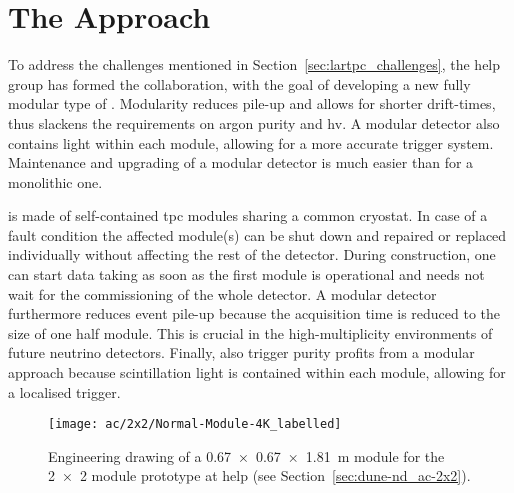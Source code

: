 \section{The \AC{} Approach}
\label{sec:ac_argoncube}

To address the challenges mentioned in Section~\ref{sec:lartpc_challenges}, the \gls{help} group has formed the \AC{} collaboration, with the goal of developing a new fully modular type of \lartpc{}.
Modularity reduces pile-up and allows for shorter drift-times, thus slackens the requirements on argon purity and \gls{hv}.
A modular detector also contains light within each module, allowing for a more accurate trigger system.
Maintenance and upgrading of a modular detector is much easier than for a monolithic one.

\AC{} is made of self-contained \gls{tpc} modules sharing a common cryostat.
In case of a fault condition the affected module(s) can be shut down and repaired or replaced individually without affecting the rest of the detector.
During construction, one can start data taking as soon as the first module is operational and needs not wait for the commissioning of the whole detector.
A modular detector furthermore reduces event pile-up because the acquisition time is reduced to the size of one half module.
This is crucial in the high-multiplicity environments of future \lar{} neutrino detectors.
Finally, also trigger purity profits from a modular approach because scintillation light is contained within each module, allowing for a localised trigger.

\begin{figure}[htb]
	\centering
	\texttt{[image: ac/2x2/Normal-Module-4K\_labelled]}
	\caption[\AC{} module engineering drawing]{%
		Engineering drawing of a \SI{0.67 x 0.67 x 1.81}{\metre} \AC{} module for the \num{2 x 2} module prototype at \acrshort{help} (see Section~\ref{sec:dune-nd_ac-2x2}).
	}
	\label{fig:ac_module}
\end{figure}

